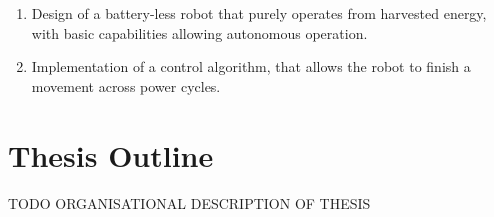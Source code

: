 \begin{enumerate}


\item Design of a battery-less robot that purely operates from harvested energy, with basic capabilities allowing autonomous operation.

\item Implementation of a control algorithm, that allows the robot to finish a movement across power cycles.



\end{enumerate}


\section{Thesis Outline}


\vspace{1\baselineskip}

\noindent
TODO ORGANISATIONAL DESCRIPTION OF THESIS

